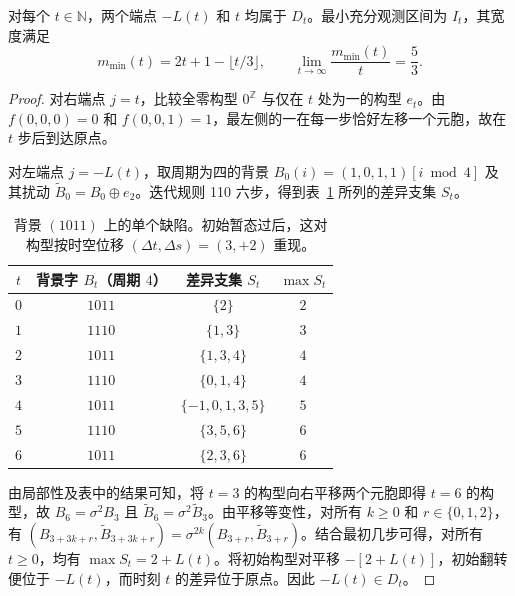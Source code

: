 \begin{theorem}[两个端点均可达到]\label{thm:sharpness}
对每个 $t \in \mathbb{N}$，两个端点 $-L(t)$ 和 $t$ 均属于 $D_t$。最小充分观测区间为 $I_t$，其宽度满足
\begin{equation}
m_{\min}(t) = 2t + 1 - \lfloor t/3 \rfloor, \qquad \lim_{t \to \infty} \frac{m_{\min}(t)}{t} = \frac{5}{3}.
\end{equation}
\end{theorem}

\begin{proof}
对右端点 $j = t$，比较全零构型 $0^{\mathbb{Z}}$ 与仅在 $t$ 处为一的构型 $e_t$。由 $f(0, 0, 0) = 0$ 和 $f(0, 0, 1) = 1$，最左侧的一在每一步恰好左移一个元胞，故在 $t$ 步后到达原点。

对左端点 $j = -L(t)$，取周期为四的背景 $B_0(i) = (1, 0, 1, 1)[i \bmod 4]$ 及其扰动 $\widetilde B_0 = B_0 \oplus e_2$。迭代规则 110 六步，得到表~\ref{tab:period4_defect} 所列的差异支集 $S_t$。

\begin{table}[h]
\centering
\caption{背景 $(1011)$ 上的单个缺陷。初始暂态过后，这对构型按时空位移 $(\Delta t, \Delta s) = (3, +2)$ 重现。}
\label{tab:period4_defect}
\begin{tabular}{cccc}
\toprule
$t$ & 背景字 $B_t$（周期 $4$）& 差异支集 $S_t$ & $\max S_t$ \\
\midrule
$0$ & $1011$ & $\{2\}$ & $2$ \\
$1$ & $1110$ & $\{1, 3\}$ & $3$ \\
$2$ & $1011$ & $\{1, 3, 4\}$ & $4$ \\
$3$ & $1110$ & $\{0, 1, 4\}$ & $4$ \\
$4$ & $1011$ & $\{-1, 0, 1, 3, 5\}$ & $5$ \\
$5$ & $1110$ & $\{3, 5, 6\}$ & $6$ \\
$6$ & $1011$ & $\{2, 3, 6\}$ & $6$ \\
\bottomrule
\end{tabular}
\end{table}

由局部性及表中的结果可知，将 $t=3$ 的构型向右平移两个元胞即得 $t=6$ 的构型，故 $B_6 = \sigma^2 B_3$ 且 $\widetilde B_6 = \sigma^2 \widetilde B_3$。由平移等变性，对所有 $k \ge 0$ 和 $r \in \{0, 1, 2\}$，有 $(B_{3+3k+r}, \widetilde B_{3+3k+r}) = \sigma^{2k}(B_{3+r}, \widetilde B_{3+r})$。结合最初几步可得，对所有 $t \ge 0$，均有 $\max S_t = 2 + L(t)$。将初始构型对平移 $-[2 + L(t)]$，初始翻转便位于 $-L(t)$，而时刻 $t$ 的差异位于原点。因此 $-L(t) \in D_t$。
\end{proof}

